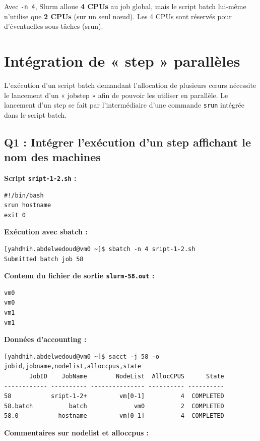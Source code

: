 \documentclass[12pt,a4paper]{article}
\newcommand{\code}[1]{\texttt{#1}}
\begin{document}
Avec \code{-n 4}, Slurm alloue \textbf{4 CPUs} au job global, mais le script batch lui-même n'utilise que \textbf{2 CPUs} (sur un seul nœud). Les 4 CPUs sont réservés pour d'éventuelles sous-tâches (srun).

\section{Intégration de « step » parallèles}

L'exécution d'un script batch demandant l'allocation de plusieurs cœurs nécessite le lancement d'un « jobstep » afin de pouvoir les utiliser en parallèle. Le lancement d'un step se fait par l'intermédiaire d'une commande \code{srun} intégrée dans le script batch.

\subsection{Q1 : Intégrer l'exécution d'un step affichant le nom des machines}

\textbf{Script \code{sript-1-2.sh} :}
\begin{lstlisting}
#!/bin/bash
srun hostname
exit 0
\end{lstlisting}

\textbf{Exécution avec sbatch :}
\begin{lstlisting}
[yahdhih.abdelwedoud@vm0 ~]$ sbatch -n 4 sript-1-2.sh
Submitted batch job 58
\end{lstlisting}

\textbf{Contenu du fichier de sortie \code{slurm-58.out} :}
\begin{lstlisting}
vm0
vm0
vm1
vm1
\end{lstlisting}

\textbf{Données d'accounting :}
\begin{lstlisting}
[yahdhih.abdelwedoud@vm0 ~]$ sacct -j 58 -o jobid,jobname,nodelist,alloccpus,state
       JobID    JobName        NodeList  AllocCPUS      State 
------------ ---------- --------------- ---------- ---------- 
58           sript-1-2+         vm[0-1]          4  COMPLETED 
58.batch          batch             vm0          2  COMPLETED 
58.0           hostname         vm[0-1]          4  COMPLETED 
\end{lstlisting}

\textbf{Commentaires sur nodelist et alloccpus :}
\end{document}
